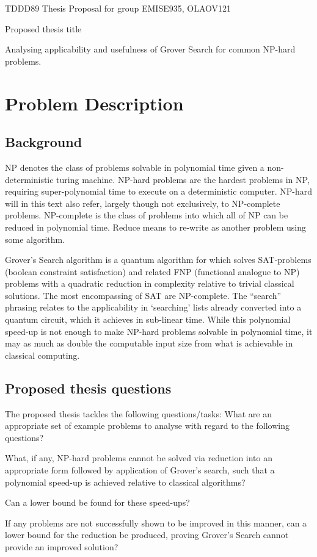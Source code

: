\documentclass[msc,lith,english]{liuthesis}
\begin{document}
TDDD89 Thesis Proposal for group EMISE935, OLAOV121

Proposed thesis title

Analysing applicability and usefulness of Grover Search for common NP-hard problems.

\section{Problem Description}
\subsection{Background}
NP denotes the class of problems solvable in polynomial time given a non-deterministic turing machine. NP-hard problems are the hardest problems in NP, requiring super-polynomial time to execute on a deterministic computer. NP-hard will in this text also refer, largely though not exclusively, to NP-complete problems. NP-complete is the class of problems into which all of NP can be reduced in polynomial time. Reduce means to re-write as another problem using some algorithm.

Grover’s Search algorithm is a quantum algorithm for which solves SAT-problems (boolean constraint satisfaction) and related FNP (functional analogue to NP) problems with a quadratic reduction in complexity relative to trivial classical solutions. The most encompassing of SAT are NP-complete. The “search” phrasing relates to the applicability in ‘searching’ lists already converted into a quantum circuit, which it achieves in sub-linear time. While this polynomial speed-up is not enough to make NP-hard problems solvable in polynomial time, it may as much as double the computable input size from what is achievable in classical computing.

\subsection{Proposed thesis questions}
The proposed thesis tackles the following questions/tasks:
What are an appropriate set of example problems to analyse with regard to the following questions?

What, if any, NP-hard problems cannot be solved via reduction into an appropriate form followed by application of Grover’s search, such that a polynomial speed-up is achieved relative to classical algorithms?

Can a lower bound be found for these speed-ups?

If any problems are not successfully shown to be improved in this manner, can a lower bound for the reduction be produced, proving Grover’s Search cannot provide an improved solution?
\end{document}
